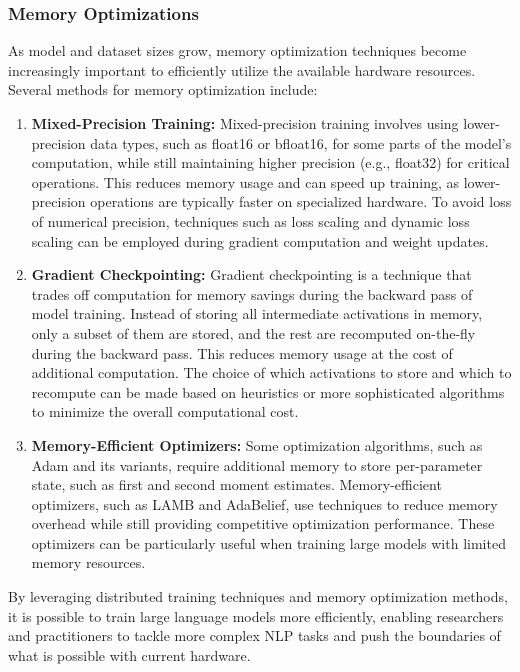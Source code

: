 \documentclass[12pt]{article}
\begin{document}
\subsubsection{Memory Optimizations}
As model and dataset sizes grow, memory optimization techniques become increasingly important to efficiently utilize the available hardware resources. Several methods for memory optimization include:


\begin{enumerate}
\item \textbf{Mixed-Precision Training:} Mixed-precision training involves using lower-precision data types, such as float16 or bfloat16, for some parts of the model's computation, while still maintaining higher precision (e.g., float32) for critical operations. This reduces memory usage and can speed up training, as lower-precision operations are typically faster on specialized hardware. To avoid loss of numerical precision, techniques such as loss scaling and dynamic loss scaling can be employed during gradient computation and weight updates.

\item \textbf{Gradient Checkpointing:} Gradient checkpointing is a technique that trades off computation for memory savings during the backward pass of model training. Instead of storing all intermediate activations in memory, only a subset of them are stored, and the rest are recomputed on-the-fly during the backward pass. This reduces memory usage at the cost of additional computation. The choice of which activations to store and which to recompute can be made based on heuristics or more sophisticated algorithms to minimize the overall computational cost.

\item \textbf{Memory-Efficient Optimizers:} Some optimization algorithms, such as Adam and its variants, require additional memory to store per-parameter state, such as first and second moment estimates. Memory-efficient optimizers, such as LAMB and AdaBelief, use techniques to reduce memory overhead while still providing competitive optimization performance. These optimizers can be particularly useful when training large models with limited memory resources.
\end{enumerate}
By leveraging distributed training techniques and memory optimization methods, it is possible to train large language models more efficiently, enabling researchers and practitioners to tackle more complex NLP tasks and push the boundaries of what is possible with current hardware.
\end{document}
